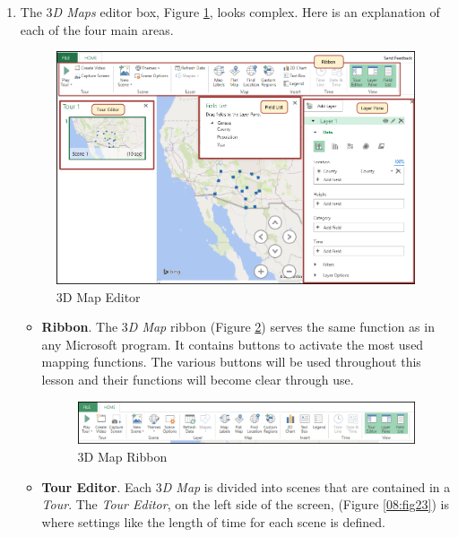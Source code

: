\begin{enumbox}
	\begin{enumerate}
		\item The \textit{$ 3 $D Maps} editor box, Figure \ref{08:fig21}, looks complex. Here is an explanation of each of the four main areas.
	
		\begin{figure}[H]
			\centering
			\includegraphics[width=\maxwidth{.95\linewidth}]{gfx/ch08_fig21}
			\caption{$ 3 $D Map Editor}
			\label{08:fig21}
		\end{figure}
		
		\begin{itemize}
			\item \textbf{Ribbon}. The \textit{$ 3 $D Map} ribbon (Figure \ref{08:fig22}) serves the same function as in any Microsoft program. It contains buttons to activate the most used mapping functions. The various buttons will be used throughout this lesson and their functions will become clear through use.
	
			\begin{figure}[H]
				\centering
				\includegraphics[width=\maxwidth{.95\linewidth}]{gfx/ch08_fig22}
				\caption{$ 3 $D Map Ribbon}
				\label{08:fig22}
			\end{figure}
	
			\item \textbf{Tour Editor}. Each \textit{$ 3 $D Map} is divided into scenes that are contained in a \textit{Tour}. The \textit{Tour Editor}, on the left side of the screen, (Figure \ref{08:fig23}) is where settings like the length of time for each scene is defined.
	

\end{itemize}
\end{enumerate}
\end{enumbox}

